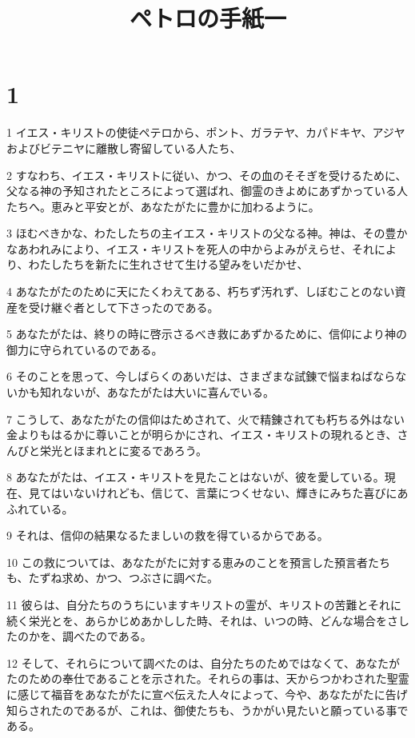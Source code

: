 

\title{ペトロの手紙一}


\chapter{1}

\par 1 イエス・キリストの使徒ペテロから、ポント、ガラテヤ、カパドキヤ、アジヤおよびビテニヤに離散し寄留している人たち、
\par 2 すなわち、イエス・キリストに従い、かつ、その血のそそぎを受けるために、父なる神の予知されたところによって選ばれ、御霊のきよめにあずかっている人たちへ。恵みと平安とが、あなたがたに豊かに加わるように。
\par 3 ほむべきかな、わたしたちの主イエス・キリストの父なる神。神は、その豊かなあわれみにより、イエス・キリストを死人の中からよみがえらせ、それにより、わたしたちを新たに生れさせて生ける望みをいだかせ、
\par 4 あなたがたのために天にたくわえてある、朽ちず汚れず、しぼむことのない資産を受け継ぐ者として下さったのである。
\par 5 あなたがたは、終りの時に啓示さるべき救にあずかるために、信仰により神の御力に守られているのである。
\par 6 そのことを思って、今しばらくのあいだは、さまざまな試錬で悩まねばならないかも知れないが、あなたがたは大いに喜んでいる。
\par 7 こうして、あなたがたの信仰はためされて、火で精錬されても朽ちる外はない金よりもはるかに尊いことが明らかにされ、イエス・キリストの現れるとき、さんびと栄光とほまれとに変るであろう。
\par 8 あなたがたは、イエス・キリストを見たことはないが、彼を愛している。現在、見てはいないけれども、信じて、言葉につくせない、輝きにみちた喜びにあふれている。
\par 9 それは、信仰の結果なるたましいの救を得ているからである。
\par 10 この救については、あなたがたに対する恵みのことを預言した預言者たちも、たずね求め、かつ、つぶさに調べた。
\par 11 彼らは、自分たちのうちにいますキリストの霊が、キリストの苦難とそれに続く栄光とを、あらかじめあかしした時、それは、いつの時、どんな場合をさしたのかを、調べたのである。
\par 12 そして、それらについて調べたのは、自分たちのためではなくて、あなたがたのための奉仕であることを示された。それらの事は、天からつかわされた聖霊に感じて福音をあなたがたに宣べ伝えた人々によって、今や、あなたがたに告げ知らされたのであるが、これは、御使たちも、うかがい見たいと願っている事である。
